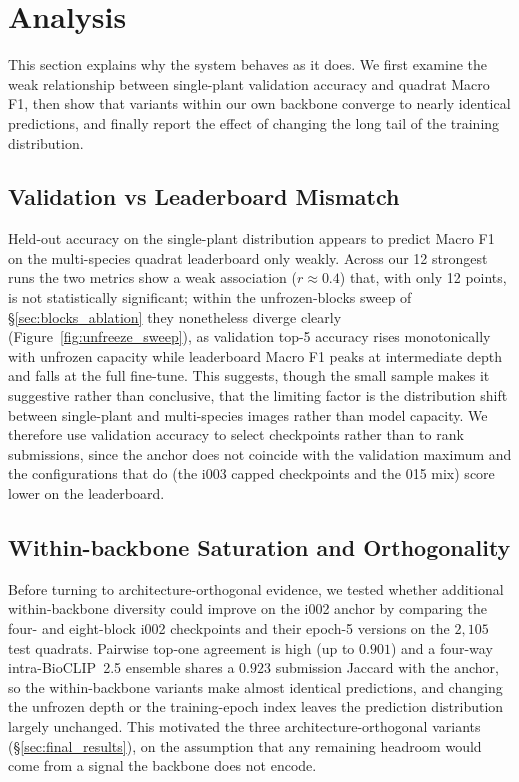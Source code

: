 \chapter{Analysis}
\label{sec:analysis}

This section explains why the system behaves as it does. We first examine the weak relationship between single-plant validation accuracy and quadrat Macro F1, then show that variants within our own backbone converge to nearly identical predictions, and finally report the effect of changing the long tail of the training distribution.

\section{Validation vs Leaderboard Mismatch}
\label{sec:val_lb}

Held-out accuracy on the single-plant distribution appears to predict Macro F1 on the multi-species quadrat leaderboard only weakly. Across our 12 strongest runs the two metrics show a weak association ($r \approx 0.4$) that, with only 12 points, is not statistically significant; within the unfrozen-blocks sweep of \S\ref{sec:blocks_ablation} they nonetheless diverge clearly (Figure~\ref{fig:unfreeze_sweep}), as validation top-5 accuracy rises monotonically with unfrozen capacity while leaderboard Macro F1 peaks at intermediate depth and falls at the full fine-tune. This suggests, though the small sample makes it suggestive rather than conclusive, that the limiting factor is the distribution shift between single-plant and multi-species images rather than model capacity. We therefore use validation accuracy to select checkpoints rather than to rank submissions, since the anchor does not coincide with the validation maximum and the configurations that do (the i003 capped checkpoints and the 015 mix) score lower on the leaderboard.

\section{Within-backbone Saturation and Orthogonality}
\label{sec:orthogonality}

Before turning to architecture-orthogonal evidence, we tested whether additional within-backbone diversity could improve on the i002 anchor by comparing the four- and eight-block i002 checkpoints and their epoch-5 versions on the $2{,}105$ test quadrats. Pairwise top-one agreement is high (up to $0.901$) and a four-way intra-BioCLIP~2.5 ensemble shares a $0.923$ submission Jaccard with the anchor, so the within-backbone variants make almost identical predictions, and changing the unfrozen depth or the training-epoch index leaves the prediction distribution largely unchanged. This motivated the three architecture-orthogonal variants (\S\ref{sec:final_results}), on the assumption that any remaining headroom would come from a signal the backbone does not encode.

